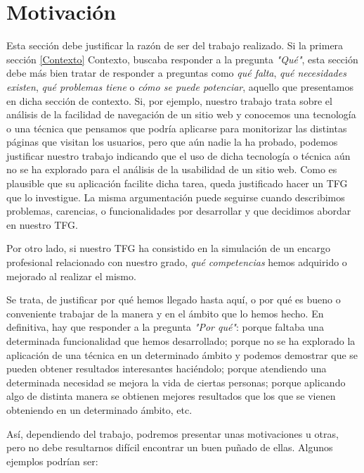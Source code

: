 \section{Motivación}\label{Motivation}
Esta sección debe justificar la razón de ser del trabajo realizado. Si la primera sección \ref{Contexto} Contexto, buscaba responder a la pregunta \textit{"Qué"}, esta sección debe más bien tratar de responder a preguntas como \textit{qué falta}, \textit{qué necesidades existen}, \textit{qué problemas tiene} o \textit{cómo se puede potenciar}, aquello que presentamos en dicha sección de contexto. Si, por ejemplo, nuestro trabajo trata sobre el análisis de la facilidad de navegación de un sitio web y conocemos una tecnología o una técnica que pensamos que podría aplicarse para monitorizar las distintas páginas que visitan los usuarios, pero que aún nadie la ha probado, podemos justificar nuestro trabajo indicando que el uso de dicha tecnología o técnica aún no se ha explorado para el análisis de la usabilidad de un sitio web. Como es plausible que su aplicación facilite dicha tarea, queda justificado hacer un TFG que lo investigue. La misma argumentación puede seguirse cuando describimos problemas, carencias, o funcionalidades por desarrollar y que decidimos abordar en nuestro TFG.

Por otro lado, si nuestro TFG ha consistido en la simulación de un encargo profesional relacionado con nuestro grado, \textit{qué competencias} hemos adquirido o mejorado al realizar el mismo.

Se trata, de justificar por qué hemos llegado hasta aquí, o por qué es bueno o conveniente trabajar de la manera y en el ámbito que lo hemos hecho. En definitiva, hay que responder a la pregunta \textit{"Por qué"}: porque faltaba una determinada funcionalidad que hemos desarrollado; porque no se ha explorado la aplicación de una técnica en un determinado ámbito y podemos demostrar que se pueden obtener resultados interesantes haciéndolo; porque atendiendo una determinada necesidad se mejora la vida de ciertas personas; porque aplicando algo de distinta manera se obtienen mejores resultados que los que se vienen obteniendo en un determinado ámbito, etc.

Así, dependiendo del trabajo, podremos presentar unas motivaciones u otras, pero no debe resultarnos difícil encontrar un buen puñado de ellas. Algunos ejemplos podrían ser: 

